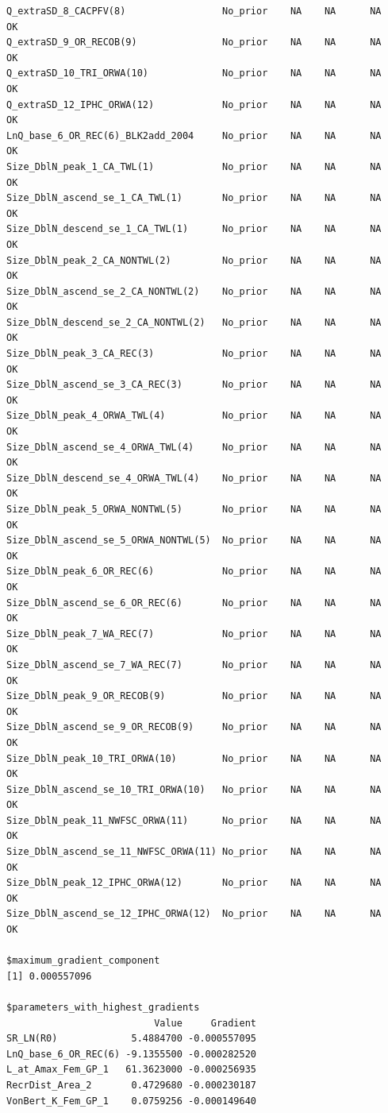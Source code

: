 \documentclass[
]{scrartcl}
\begin{document}
\begin{verbatim}
Q_extraSD_8_CACPFV(8)                 No_prior    NA    NA      NA         OK
Q_extraSD_9_OR_RECOB(9)               No_prior    NA    NA      NA         OK
Q_extraSD_10_TRI_ORWA(10)             No_prior    NA    NA      NA         OK
Q_extraSD_12_IPHC_ORWA(12)            No_prior    NA    NA      NA         OK
LnQ_base_6_OR_REC(6)_BLK2add_2004     No_prior    NA    NA      NA         OK
Size_DblN_peak_1_CA_TWL(1)            No_prior    NA    NA      NA         OK
Size_DblN_ascend_se_1_CA_TWL(1)       No_prior    NA    NA      NA         OK
Size_DblN_descend_se_1_CA_TWL(1)      No_prior    NA    NA      NA         OK
Size_DblN_peak_2_CA_NONTWL(2)         No_prior    NA    NA      NA         OK
Size_DblN_ascend_se_2_CA_NONTWL(2)    No_prior    NA    NA      NA         OK
Size_DblN_descend_se_2_CA_NONTWL(2)   No_prior    NA    NA      NA         OK
Size_DblN_peak_3_CA_REC(3)            No_prior    NA    NA      NA         OK
Size_DblN_ascend_se_3_CA_REC(3)       No_prior    NA    NA      NA         OK
Size_DblN_peak_4_ORWA_TWL(4)          No_prior    NA    NA      NA         OK
Size_DblN_ascend_se_4_ORWA_TWL(4)     No_prior    NA    NA      NA         OK
Size_DblN_descend_se_4_ORWA_TWL(4)    No_prior    NA    NA      NA         OK
Size_DblN_peak_5_ORWA_NONTWL(5)       No_prior    NA    NA      NA         OK
Size_DblN_ascend_se_5_ORWA_NONTWL(5)  No_prior    NA    NA      NA         OK
Size_DblN_peak_6_OR_REC(6)            No_prior    NA    NA      NA         OK
Size_DblN_ascend_se_6_OR_REC(6)       No_prior    NA    NA      NA         OK
Size_DblN_peak_7_WA_REC(7)            No_prior    NA    NA      NA         OK
Size_DblN_ascend_se_7_WA_REC(7)       No_prior    NA    NA      NA         OK
Size_DblN_peak_9_OR_RECOB(9)          No_prior    NA    NA      NA         OK
Size_DblN_ascend_se_9_OR_RECOB(9)     No_prior    NA    NA      NA         OK
Size_DblN_peak_10_TRI_ORWA(10)        No_prior    NA    NA      NA         OK
Size_DblN_ascend_se_10_TRI_ORWA(10)   No_prior    NA    NA      NA         OK
Size_DblN_peak_11_NWFSC_ORWA(11)      No_prior    NA    NA      NA         OK
Size_DblN_ascend_se_11_NWFSC_ORWA(11) No_prior    NA    NA      NA         OK
Size_DblN_peak_12_IPHC_ORWA(12)       No_prior    NA    NA      NA         OK
Size_DblN_ascend_se_12_IPHC_ORWA(12)  No_prior    NA    NA      NA         OK

$maximum_gradient_component
[1] 0.000557096

$parameters_with_highest_gradients
                          Value     Gradient
SR_LN(R0)             5.4884700 -0.000557095
LnQ_base_6_OR_REC(6) -9.1355500 -0.000282520
L_at_Amax_Fem_GP_1   61.3623000 -0.000256935
RecrDist_Area_2       0.4729680 -0.000230187
VonBert_K_Fem_GP_1    0.0759256 -0.000149640


\end{verbatim}
\end{document}
